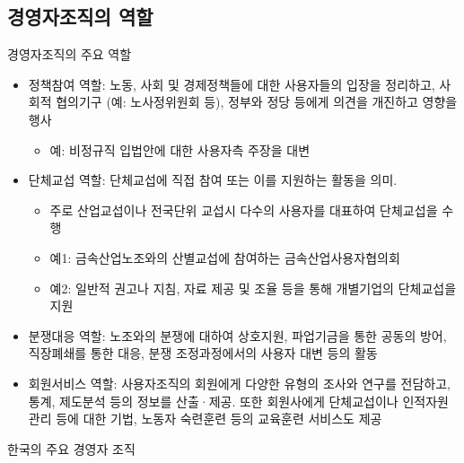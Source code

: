 \documentclass[aspectratio=169,xcolor=dvipsnames,handout]{beamer}
\begin{document}
\subsection{경영자조직의 역할}
\begin{frame}[allowframebreaks]{경영자조직의 주요 역할}
    \begin{itemize}[<+->]
        \item 정책참여 역할: 노동, 사회 및 경제정책들에 대한 사용자들의 입장을 정리하고, 사회적 협의기구 (예: 노사정위원회 등), 정부와 정당 등에게 의견을 개진하고 영향을 행사
        \begin{itemize}[<+->]
            \item 예: 비정규직 입법안에 대한 사용자측 주장을 대변
        \end{itemize}
        \item 단체교섭 역할: 단체교섭에 직접 참여 또는 이를 지원하는 활동을 의미.
        \begin{itemize}[<+->]
            \item 주로 산업교섭이나 전국단위 교섭시 다수의 사용자를 대표하여 단체교섭을 수행
            \item 예1: 금속산업노조와의 산별교섭에 참여하는 금속산업사용자협의회
            \item 예2: 일반적 권고나 지침, 자료 제공 및 조율 등을 통해 개별기업의 단체교섭을 지원
        \end{itemize}
        \framebreak\relax
        \item 분쟁대응 역할: 노조와의 분쟁에 대하여 상호지원, 파업기금을 통한 공동의 방어, 직장폐쇄를 통한 대응, 분쟁 조정과정에서의 사용자 대변 등의 활동
        \item 회원서비스 역할: 사용자조직의 회원에게 다양한 유형의 조사와 연구를 전담하고, 통계, 제도분석 등의 정보를 산출·제공. 또한 회원사에게 단체교섭이나 인적자원관리 등에 대한 기법, 노동자 숙련훈련 등의 교육훈련 서비스도 제공
    \end{itemize}
\end{frame}

\begin{frame}{한국의 주요 경영자 조직}
    \scriptsize
    \begin{table}
        \centering
        \resizebox{.8\textwidth}{!}{\relax
            
        }
        \\
        \raggedright\relax %
        \caption{한국 경영자조직의 현황}
    \end{table}
\end{frame}
\end{document}
